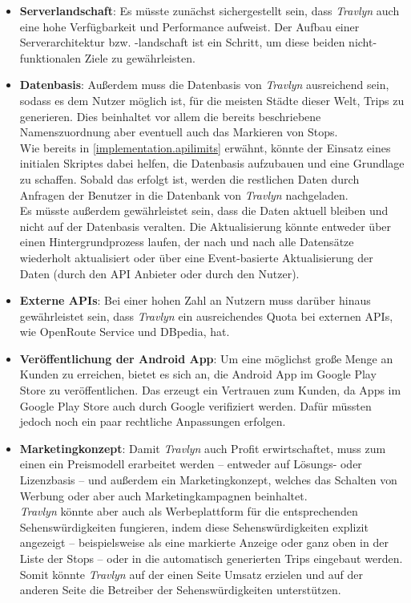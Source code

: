 		\begin{itemize}
			\item \textbf{Serverlandschaft}: 
				Es müsste zunächst sichergestellt sein, dass \textit{Travlyn} auch eine hohe Verfügbarkeit und Performance aufweist. Der Aufbau einer Serverarchitektur bzw. -landschaft ist ein Schritt, um diese beiden nicht-funktionalen Ziele zu gewährleisten. 
			\item \textbf{Datenbasis}: 
				Außerdem muss die Datenbasis von \textit{Travlyn} ausreichend sein, sodass es dem Nutzer möglich ist, für die meisten Städte dieser Welt, Trips zu generieren. Dies beinhaltet vor allem die bereits beschriebene Namenszuordnung aber eventuell auch das Markieren von Stops. \\
				Wie bereits in \autoref{implementation.apilimits} erwähnt, könnte der Einsatz eines initialen Skriptes dabei helfen, die Datenbasis aufzubauen und eine Grundlage zu schaffen. Sobald das erfolgt ist, werden die restlichen Daten durch Anfragen der Benutzer in die Datenbank von \textit{Travlyn} nachgeladen. \\
				Es müsste außerdem gewährleistet sein, dass die Daten aktuell bleiben und nicht auf der Datenbasis veralten. Die Aktualisierung könnte entweder über einen Hintergrundprozess laufen, der nach und nach alle Datensätze wiederholt aktualisiert oder über eine Event-basierte Aktualisierung der Daten (durch den \acs{API} Anbieter oder durch den Nutzer). 
			\item \textbf{Externe \acs{API}s}: 
				Bei einer hohen Zahl an Nutzern muss darüber hinaus gewährleistet sein, dass \textit{Travlyn} ein ausreichendes Quota bei externen \acs{API}s, wie OpenRoute Service und DBpedia, hat. 
			\item \textbf{Veröffentlichung der Android App}: 
				Um eine möglichst große Menge an Kunden zu erreichen, bietet es sich an, die Android App im Google Play Store zu veröffentlichen. Das erzeugt ein Vertrauen zum Kunden, da Apps im Google Play Store auch durch Google verifiziert werden. Dafür müssten jedoch noch ein paar rechtliche Anpassungen erfolgen. 
			\item \textbf{Marketingkonzept}: 
				Damit \textit{Travlyn} auch Profit erwirtschaftet, muss zum einen ein Preismodell erarbeitet werden -- entweder auf Lösungs- oder Lizenzbasis -- und außerdem ein Marketingkonzept, welches das Schalten von Werbung oder aber auch Marketingkampagnen beinhaltet.\\
				\textit{Travlyn} könnte aber auch als Werbeplattform für die entsprechenden Sehenswürdigkeiten fungieren, indem diese Sehenswürdigkeiten explizit angezeigt -- beispielsweise als eine markierte Anzeige oder ganz oben in der Liste der Stops -- oder in die automatisch generierten Trips eingebaut werden. Somit könnte \textit{Travlyn} auf der einen Seite Umsatz erzielen und auf der anderen Seite die Betreiber der Sehenswürdigkeiten unterstützen. 
		\end{itemize}
	
		
	